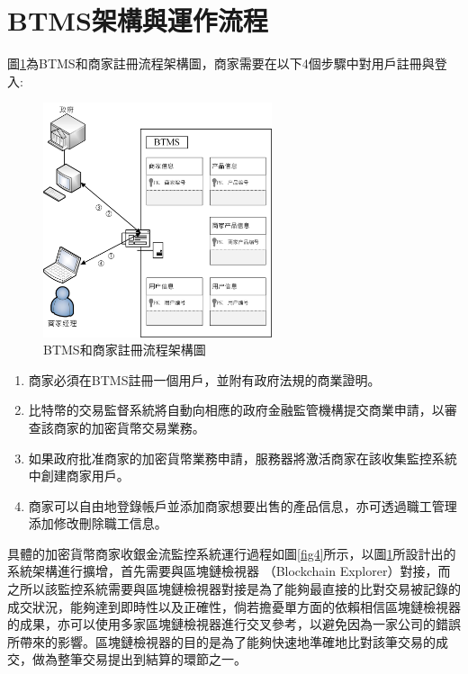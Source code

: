 \section{BTMS架構與運作流程}

	圖\ref{fig3}為BTMS和商家註冊流程架構圖，商家需要在以下4個步驟中對用戶註冊與登入:

	\begin{figure}[!htbp]
		\centering
		\includegraphics[width = 0.6\textwidth]{fig3.jpg}
		\caption{BTMS和商家註冊流程架構圖}\label{fig3}
	\end{figure}

	\begin{enumerate}
		\item 商家必須在BTMS註冊一個用戶，並附有政府法規的商業證明。
		\item 比特幣的交易監督系統將自動向相應的政府金融監管機構提交商業申請，以審查該商家的加密貨幣交易業務。
		\item 如果政府批准商家的加密貨幣業務申請，服務器將激活商家在該收集監控系統中創建商家用戶。
		\item 商家可以自由地登錄帳戶並添加商家想要出售的產品信息，亦可透過職工管理添加修改刪除職工信息。
	\end{enumerate}

	具體的加密貨幣商家收銀金流監控系統運行過程如圖\ref{fig4}所示，以圖\ref{fig3}所設計出的系統架構進行擴增，首先需要與區塊鏈檢視器 （Blockchain Explorer）\supercite{Blockchainexplorer:Ananalyticalprocessandinvestigationenvironmentforbitcoin}對接，而之所以該監控系統需要與區塊鏈檢視器對接是為了能夠最直接的比對交易被記錄的成交狀況，能夠達到即時性以及正確性，倘若擔憂單方面的依賴相信區塊鏈檢視器的成果，亦可以使用多家區塊鏈檢視器進行交叉參考，以避免因為一家公司的錯誤所帶來的影響。區塊鏈檢視器的目的是為了能夠快速地準確地比對該筆交易的成交，做為整筆交易提出到結算的環節之一。

